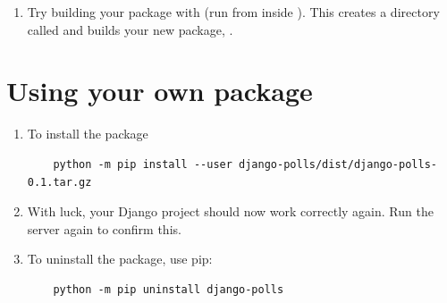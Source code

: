 \begin{enumerate}
\item Try building your package with  (run from inside ). This creates a directory called  and builds your new package, .
\end{enumerate}


\section{Using your own package}

\begin{enumerate}
\item To install the package
  \lstset{language=Sh}
  \begin{lstlisting}
    python -m pip install --user django-polls/dist/django-polls-0.1.tar.gz
  \end{lstlisting}
\item With luck, your Django project should now work correctly again. Run the server again to confirm this.
\item To uninstall the package, use pip:
  \begin{lstlisting}
    python -m pip uninstall django-polls
  \end{lstlisting}
\end{enumerate}


